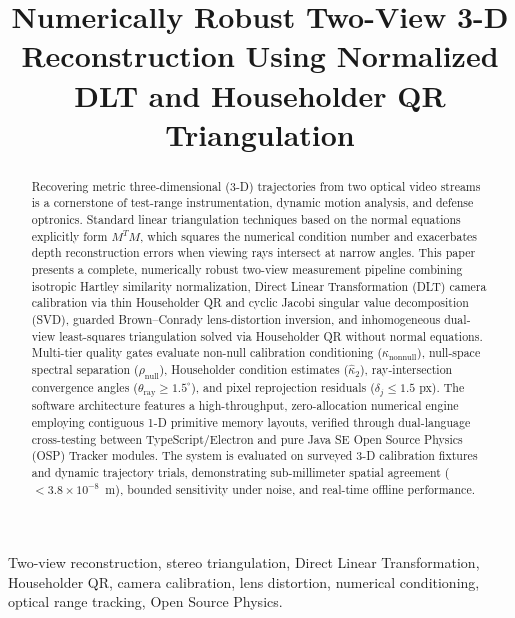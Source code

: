 \documentclass[a4paper,conference]{IEEEtran}
\newcommand{\kappaTwo}{\widehat{\kappa}_2}
\begin{document}
\title{Numerically Robust Two-View 3-D Reconstruction Using Normalized DLT and Householder QR Triangulation}

\author{
}

\maketitle

\begin{abstract}
Recovering metric three-dimensional (3-D) trajectories from two optical video streams is a cornerstone of test-range instrumentation, dynamic motion analysis, and defense optronics. Standard linear triangulation techniques based on the normal equations explicitly form $M^T M$, which squares the numerical condition number and exacerbates depth reconstruction errors when viewing rays intersect at narrow angles. This paper presents a complete, numerically robust two-view measurement pipeline combining isotropic Hartley similarity normalization, Direct Linear Transformation (DLT) camera calibration via thin Householder QR and cyclic Jacobi singular value decomposition (SVD), guarded Brown--Conrady lens-distortion inversion, and inhomogeneous dual-view least-squares triangulation solved via Householder QR without normal equations. Multi-tier quality gates evaluate non-null calibration conditioning ($\kappa_{\mathrm{nonnull}}$), null-space spectral separation ($\rho_{\mathrm{null}}$), Householder condition estimates ($\kappaTwo$), ray-intersection convergence angles ($\theta_{\mathrm{ray}} \ge 1.5^\circ$), and pixel reprojection residuals ($\delta_j \le 1.5$ px). The software architecture features a high-throughput, zero-allocation numerical engine employing contiguous 1-D primitive memory layouts, verified through dual-language cross-testing between TypeScript/Electron and pure Java SE Open Source Physics (OSP) Tracker modules. The system is evaluated on surveyed 3-D calibration fixtures and dynamic trajectory trials, demonstrating sub-millimeter spatial agreement ($<3.8 \times 10^{-8}$~m), bounded sensitivity under noise, and real-time offline performance.
\end{abstract}

\begin{IEEEkeywords}
Two-view reconstruction, stereo triangulation, Direct Linear Transformation, Householder QR, camera calibration, lens distortion, numerical conditioning, optical range tracking, Open Source Physics.
\end{IEEEkeywords}
\end{document}
